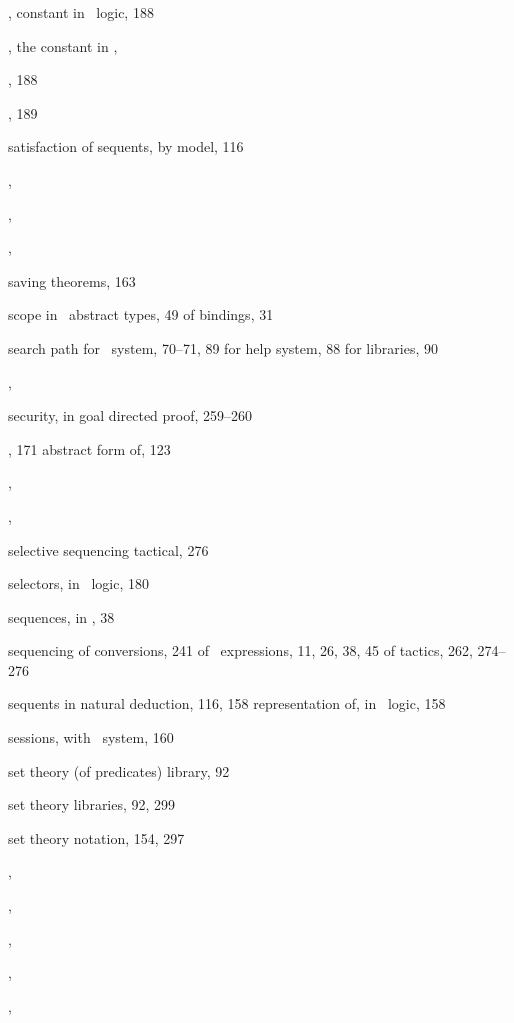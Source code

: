\begin{theindex}
  \item {}, constant in \HOL\ logic, 188
  \item {}, the constant in \ML, 
  \item {}, 188
  \item {}, 189
  \item satisfaction of sequents, by model, 116
  \item {}, 
  \item {}, 
  \item {}, 
  \item saving theorems, 163
  \item scope
    \subitem in \ML\ abstract types, 49
    \subitem of bindings, 31
  \item search path
    \subitem for \HOL\ system, 70--71, 89
    \subitem for help system, 88
    \subitem for libraries, 90
  \item {}, 
  \item security, in goal directed proof, 259--260
  \item {}, 171
    \subitem abstract form of, 123
  \item {}, 
  \item {}, 
  \item selective sequencing tactical, 276
  \item selectors, in \HOL\ logic, 180
  \item sequences, in \ML, 38
  \item sequencing
    \subitem of conversions, 241
    \subitem of \ML\ expressions, 11, 26, 38, 45
    \subitem of tactics, 262, 274--276
  \item sequents
    \subitem in natural deduction, 116, 158
    \subitem representation of, in \HOL\ logic, 158
  \item sessions, with \HOL\ system, 160
  \item set theory (of predicates) library, 92
  \item set theory libraries, 92, 299
  \item set theory notation, 154, 297
  \item {}, 
  \item {}, 
  \item {}, 
  \item {}, 
  \item {}, 

\end{theindex}
